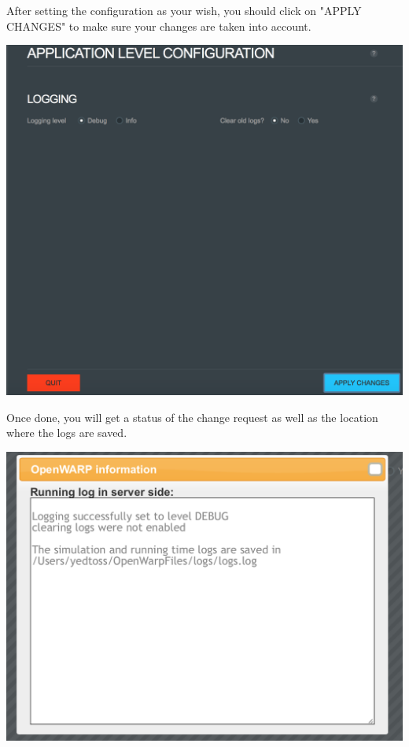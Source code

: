 \documentclass[12pt]{article}
\begin{document}
After setting the configuration as your wish, you should click on
"APPLY CHANGES" to make sure your changes are taken into account.

\vspace{\abovedisplayskip}
\begin{minipage}{\linewidth}
	\centering
	\includegraphics[scale=0.5]{img/40}
\end{minipage}
\vspace{\belowdisplayskip}

Once done, you will get a status of the change request as well as the location where the logs are saved.

\vspace{\abovedisplayskip}
\begin{minipage}{\linewidth}
	\centering
	\includegraphics[scale=0.5]{img/41}
\end{minipage}
\vspace{\belowdisplayskip}
\end{document}
